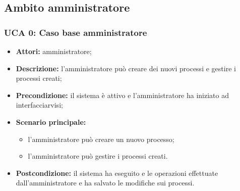 \subsection{Ambito amministratore}

\iffalse  %
\paragraph{UCA 1:}
\begin{itemize}
\item \textbf{Attori:} amministratore;
\item \textbf{Descrizione:} 
\item \textbf{Precondizione:} 
\item \textbf{Scenario principale:} 
\begin{itemize}
\item 
\end{itemize}
\item \textbf{Postcondizione:}
\end{itemize}
\fi

\subsubsection{UCA 0: Caso base amministratore}
\begin{itemize}
\item \textbf{Attori:} amministratore;
\item \textbf{Descrizione:} l'amministratore può creare dei nuovi processi e gestire i processi creati;
\item \textbf{Precondizione:} il sistema è attivo e l'amministratore ha iniziato ad interfacciarvisi;
\item \textbf{Scenario principale:} 
\begin{itemize}
\item l'amministratore può creare un nuovo processo;
\item l'amministratore può gestire i processi creati.
\end{itemize}
\item \textbf{Postcondizione:} il sistema ha eseguito e le operazioni effettuate dall'amministratore e ha salvato le modifiche sui processi.
\end{itemize}


